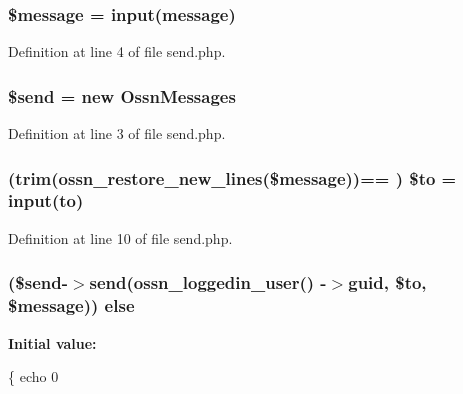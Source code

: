 \subsubsection[{\texorpdfstring{\$message}{$message}}]{\setlength{\rightskip}{0pt plus 5cm}\$message = {\bf input}(\textquotesingle{}message\textquotesingle{})}\hypertarget{_ossn_messages_2actions_2message_2send_8php_abf17cb2dba2ed17cb28aa5f37deb5293}{}\label{_ossn_messages_2actions_2message_2send_8php_abf17cb2dba2ed17cb28aa5f37deb5293}


Definition at line 4 of file send.\+php.

\subsubsection[{\texorpdfstring{\$send}{$send}}]{\setlength{\rightskip}{0pt plus 5cm}\$send = new {\bf Ossn\+Messages}}\hypertarget{_ossn_messages_2actions_2message_2send_8php_ac3ef1eb98db8a01e92b262323467d775}{}\label{_ossn_messages_2actions_2message_2send_8php_ac3ef1eb98db8a01e92b262323467d775}


Definition at line 3 of file send.\+php.

\subsubsection[{\texorpdfstring{\$to}{$to}}]{ (trim({\bf ossn\+\_\+restore\+\_\+new\+\_\+lines}(\$message))== \textquotesingle{}\textquotesingle{}) \$to = {\bf input}(\textquotesingle{}to\textquotesingle{})}\hypertarget{_ossn_messages_2actions_2message_2send_8php_ad0e9529b4e89689767bdc23a46f1d182}{}\label{_ossn_messages_2actions_2message_2send_8php_ad0e9529b4e89689767bdc23a46f1d182}


Definition at line 10 of file send.\+php.

\subsubsection[{\texorpdfstring{else}{else}}]{ (\$send-\/$>$send({\bf ossn\+\_\+loggedin\+\_\+user}() -\/$>$guid, \$to, \$message)) else}\hypertarget{_ossn_messages_2actions_2message_2send_8php_acd6cab06649b8093f0070f6485236b8e}{}\label{_ossn_messages_2actions_2message_2send_8php_acd6cab06649b8093f0070f6485236b8e}
{\bfseries Initial value\+:}
\begin{DoxyCode}
\{
    echo 0
\end{DoxyCode}


